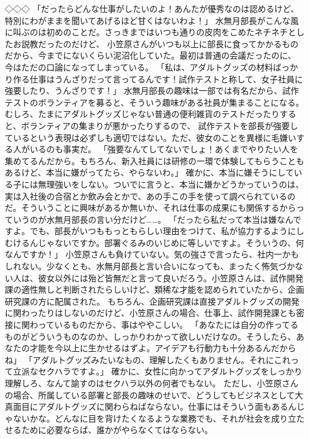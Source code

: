 ◇◇◇
「だったらどんな仕事がしたいのよ！あんたが優秀なのは認めるけど、特別にわがままを聞いてあげるほど甘くはないわよ！」
水無月部長がこんな風に叫ぶのは初めのことだ。さっきまではいつも通りの皮肉をこめたネチネチとしたお説教だったのだけど、
小笠原さんがいつも以上に部長に食ってかかるものだから、今までにないくらい泥沼化していた。最初は普通の会議だったのに、
今はただの口論になってしまっている。
「私は、アダルトグッズの材料ばっかり作る仕事はうんざりだって言ってるんです！試作テストと称して、女子社員に強要したり、うんざりです！」
水無月部長の趣味は一部では有名だから、試作テストのボランティアを募ると、そういう趣味がある社員が集まることになる。
むしろ、たまにアダルトグッズじゃない普通の便利雑貨のテストだったりすると、ボランティアの集まりが悪かったりするので、
試作テストを部長が強要しているという表現は必ずしも適切ではない。ただ、彼女のことを異様に毛嫌いする人がいるのも事実だ。
「強要なんてしてないでしょ！あくまでやりたい人を集めてるんだから。もちろん、新入社員には研修の一環で体験してもらうこともあるけど、本当に嫌がってたら、やらないわ。」
確かに、本当に嫌そうにしている子には無理強いをしない。ついでに言うと、本当に嫌かどうかっていうのは、実は入社後の合宿とか飲み会とかで、あの手この手を使って調べられているのだ。そういうことに興味があるか無いか、それは仕事の成果にも関係するからっていうのが水無月部長の言い分だけど……。
「だったら私だって本当は嫌なんですよ。でも、部長がいつももっともらしい理由をつけて、私が協力するようにしむけるんじゃないですか。部署ぐるみのいじめに等しいですよ。そういうの、何なんですか！」
小笠原さんも負けていない。気の強さで言ったら、社内一かもしれない。少なくとも、水無月部長と言い合いになっても、まったく怖気づかない人は、彼女以外には殆ど皆無だと言って良いだろう。小笠原さんは、試作開発課の適性無しと判断されたらしいけど、類稀な才能を認められていたから、企画研究課の方に配属された。
もちろん、企画研究課は直接アダルトグッズの開発に関わったりはしないのだけど、小笠原さんの場合、仕事上、試作開発課とも密接に関わっているものだから、事はややこしい。
「あなたには自分の作ってるものがどういうものなのか、しっかりわかって欲しいだけなの。そうしたら、あなたの才能を今以上に生かせるはずよ。アイデアも行動力も十分あるんだからね」
「アダルトグッズみたいなもの、理解したくもありません。それにこれって立派なセクハラですよ。」
確かに、女性に向かってアダルトグッズをしっかり理解しろ、なんて諭すのはセクハラ以外の何者でもない。
ただし、小笠原さんの場合、所属している部署と部長の趣味のせいで、どうしてもビジネスとして大真面目にアダルトグッズに関わらねばならない。仕事にはそういう面もあるんじゃないかな。どんなに目を背けたくなるような業務でも、それが社会を成り立たせるために必要ならば、誰かがやらなくてはならない。

